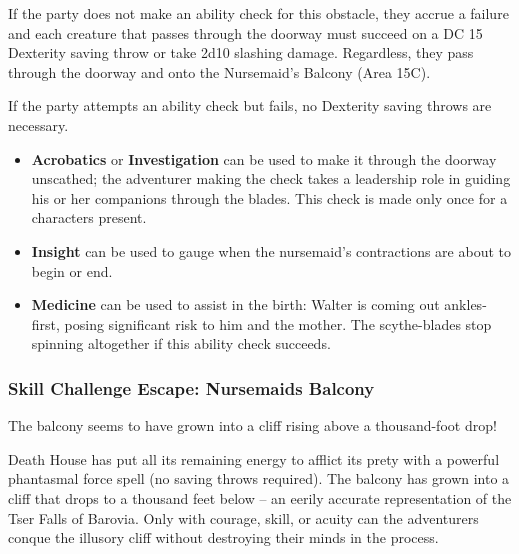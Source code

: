 If the party does not make an ability check for this obstacle, they accrue a failure and each creature that
passes through the doorway must succeed on a DC 15 Dexterity saving throw or take 2d10 slashing damage.
Regardless, they pass through the doorway and onto the Nursemaid's Balcony (Area 15C).

If the party attempts an ability check but fails, no Dexterity saving throws are necessary.
\begin{skillChallenge}
  \begin{itemize}
    \item \textbf{Acrobatics} or \textbf{Investigation} can be used to make it through the doorway unscathed;
    the adventurer making the check takes a leadership role in guiding his or her companions through the blades.
    This check is made only once for a characters present. \moderateDC
    \item \textbf{Insight} can be used to gauge when the nursemaid's contractions are about to begin or end.
    \moderateDC
    \item \textbf{Medicine} can be used to assist in the birth: Walter is coming out ankles-first, posing
    significant risk to him and the mother. The scythe-blades stop spinning altogether if this ability check
    succeeds. \hardDC
  \end{itemize}
\end{skillChallenge}

\subsubsection*{Skill Challenge Escape: Nursemaids Balcony}
\label{sec:SC_NursemaidsBalcony}
\begin{readout}
  The balcony seems to have grown into a cliff rising above a thousand-foot drop!
\end{readout}
Death House has put all its remaining energy to afflict its prety with a powerful phantasmal force spell (no
saving throws required). The balcony has grown into a cliff that drops to a thousand feet below -- an eerily 
accurate representation of the Tser Falls of Barovia. Only with courage, skill, or acuity can the adventurers
conque the illusory cliff without destroying their minds in the process.

